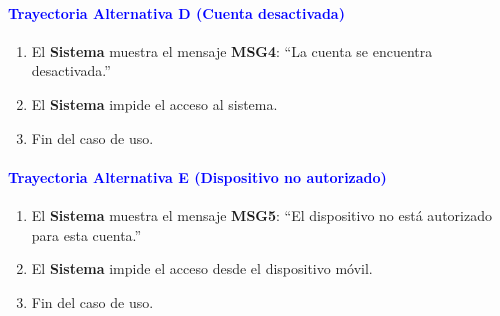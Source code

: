 \paragraph{\textbf{\textcolor{blue}{Trayectoria Alternativa D (Cuenta desactivada)}}}
\begin{enumerate}
    \item El \textbf{Sistema} muestra el mensaje \textbf{MSG4}: ``La cuenta se encuentra desactivada.''
    \item El \textbf{Sistema} impide el acceso al sistema.
    \item Fin del caso de uso.
\end{enumerate}

\paragraph{\textbf{\textcolor{blue}{Trayectoria Alternativa E (Dispositivo no autorizado)}}}
\begin{enumerate}
    \item El \textbf{Sistema} muestra el mensaje \textbf{MSG5}: ``El dispositivo no está autorizado para esta cuenta.''
    \item El \textbf{Sistema} impide el acceso desde el dispositivo móvil.
    \item Fin del caso de uso.
\end{enumerate}

